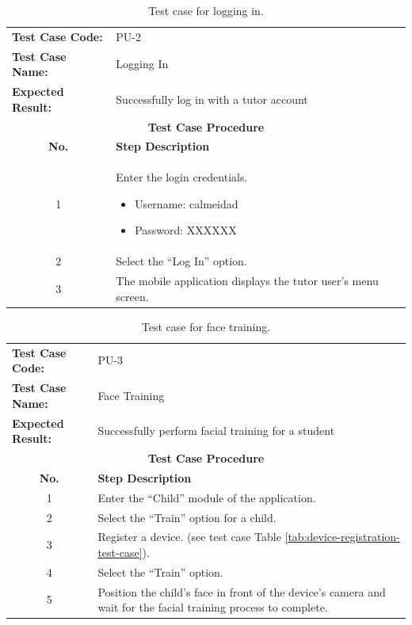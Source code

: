 \documentclass[a4paper,fleqn]{cas-sc}
\begin{document}
			\begin{table}[hbt!]
				\centering
				\caption{Test case for logging in.}
				\label{tab:login-test-case}
				\begin{tabularx}{\textwidth}{l X}
					\toprule
					\textbf{Test Case Code:} & PU-2 \\
					\textbf{Test Case Name:} & Logging In \\
					\textbf{Expected Result:} & Successfully log in with a tutor account \\ \midrule
					\multicolumn{2}{c}{\textbf{Test Case Procedure}} \\ \midrule
					\multicolumn{1}{c}{\textbf{No.}} & \textbf{Step Description} \\ \midrule
					\multicolumn{1}{c}{1} & Enter the login credentials.
					\begin{itemize}
						\item Username: calmeidad
						\item Password: XXXXXX
					\end{itemize} \\
					\multicolumn{1}{c}{2} & Select the ``Log In'' option. \\
					\multicolumn{1}{c}{3} & The mobile application displays the tutor user's menu screen. \\
					\bottomrule
				\end{tabularx}
			\end{table}
			
			\begin{table}[hbt!]
				\centering
				\caption{Test case for face training.}
				\label{tab:face-training-test-case}
				\begin{tabularx}{\textwidth}{l X}
					\toprule
					\textbf{Test Case Code:} & PU-3 \\
					\textbf{Test Case Name:} & Face Training \\
					\textbf{Expected Result:} & Successfully perform facial training for a student\\
					\midrule
					\multicolumn{2}{c}{\textbf{Test Case Procedure}} \\
					\midrule
					\multicolumn{1}{c}{\textbf{No.}} & \textbf{Step Description} \\
					\midrule
					\multicolumn{1}{c}{1} & Enter the ``Child'' module of the application. \\
					\multicolumn{1}{c}{2} & Select the ``Train'' option for a child. \\
					\multicolumn{1}{c}{3} & Register a device. (see test case Table \ref{tab:device-registration-test-case}). \\
					\multicolumn{1}{c}{4} & Select the ``Train'' option. \\
					\multicolumn{1}{c}{5} & Position the child's face in front of the device's camera and wait for the facial training process to complete. \\
					\bottomrule
				\end{tabularx}
			\end{table}
			
\end{document}
